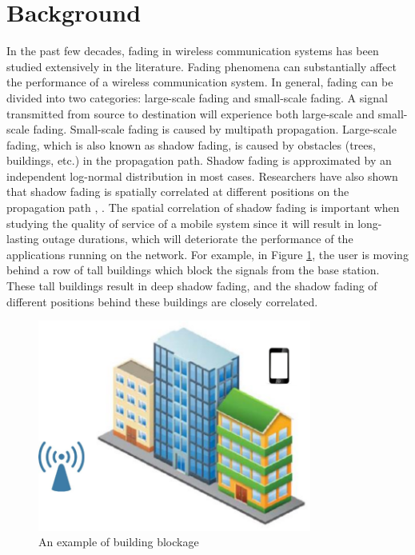 \section{Background}
In the past few decades, fading in wireless communication systems has been studied extensively in the literature. Fading phenomena can substantially affect the performance of a wireless communication system. In general, fading can be divided into two categories: large-scale fading and small-scale fading. A signal transmitted from source to destination will experience both large-scale and small-scale fading. Small-scale fading is caused by multipath propagation. Large-scale fading, which is also known as shadow fading, is caused by obstacles (trees, buildings, etc.) in the propagation path. Shadow fading is approximated by an independent log-normal distribution \cite{rappaport1996wireless} in most cases. Researchers have also shown that shadow fading is spatially correlated at different positions on the propagation path \cite{gudmundson1991correlation}, \cite{zhang2008novel}. The spatial correlation of shadow fading is important when studying the quality of service of a mobile system since it will result in long-lasting outage durations, which will deteriorate the performance of the applications running on the network. For example, in Figure \ref{building2}, the user is moving behind a row of tall buildings which block the signals from the base station. These tall buildings result in deep shadow fading, and the shadow fading of different positions behind these buildings are closely correlated.
\begin{figure}
\centering
\includegraphics[width=9cm]{building.eps}
\caption{An example of building blockage}
\label{building2}
\end{figure}
